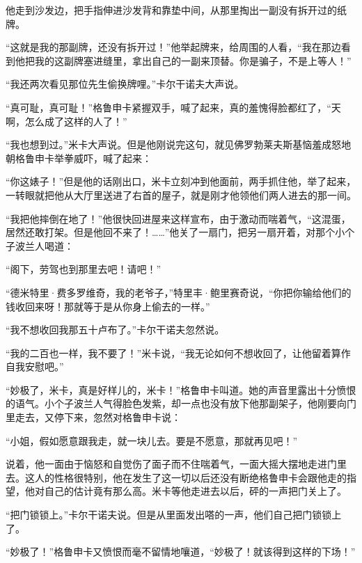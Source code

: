 \par 他走到沙发边，把手指伸进沙发背和靠垫中间，从那里掏出一副没有拆开过的纸牌。
\par “这就是我的那副牌，还没有拆开过！”他举起牌来，给周围的人看，“我在那边看到他把我的这副牌塞进缝里，拿出自己的一副来顶替。你是骗子，不是上等人！”
\par “我还两次看见那位先生偷换牌哩。”卡尔干诺夫大声说。
\par “真可耻，真可耻！”格鲁申卡紧握双手，喊了起来，真的羞愧得脸都红了，“天啊，怎么成了这样的人了！”
\par “我也想到过。”米卡大声说。但是他刚说完这句，就见佛罗勃莱夫斯基恼羞成怒地朝格鲁申卡举拳威吓，喊了起来：
\par “你这婊子！”但是他的话刚出口，米卡立刻冲到他面前，两手抓住他，举了起来，一转眼就把他从大厅里送进了右首的屋子，就是刚才他领他们两人进去的那一间。
\par “我把他摔倒在地了！”他很快回进屋来这样宣布，由于激动而喘着气，“这混蛋，居然还敢打架。但是他回不来了！……”他关了一扇门，把另一扇开着，对那个小个子波兰人喝道：
\par “阁下，劳驾也到那里去吧！请吧！”
\par “德米特里·费多罗维奇，我的老爷子，”特里丰·鲍里赛奇说，“你把你输给他们的钱收回来呀！那就等于是从你身上偷去的一样。”
\par “我不想收回我那五十卢布了。”卡尔干诺夫忽然说。
\par “我的二百也一样，我不要了！”米卡说，“我无论如何不想收回了，让他留着算作自我安慰吧。”
\par “妙极了，米卡，真是好样儿的，米卡！”格鲁申卡叫道。她的声音里露出十分愤恨的语气。小个子波兰人气得脸色发紫，却一点也没有放下他那副架子，他刚要向门里走去，又停下来，忽然对格鲁申卡说：
\par “小姐，假如愿意跟我走，就一块儿去。要是不愿意，那就再见吧！”
\par 说着，他一面由于恼怒和自觉伤了面子而不住喘着气，一面大摇大摆地走进门里去。这人的性格很特别，他在发生了这一切以后还没有断绝格鲁申卡会跟他走的指望，他对自己的估计竟有那么高。米卡等他走进去以后，砰的一声把门关上了。
\par “把门锁锁上。”卡尔干诺夫说。但是从里面发出嗒的一声，他们自己把门锁锁上了。
\par “妙极了！”格鲁申卡又愤恨而毫不留情地嚷道，“妙极了！就该得到这样的下场！”
